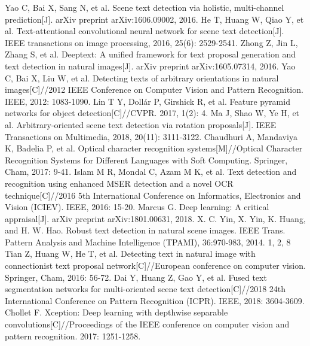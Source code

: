 \documentclass[22pt, UTF8]{article}
\numberwithin{figure}{section}
\numberwithin{table}{section}
\numberwithin{equation}{section} %
\begin{document}
\newpage
\begin{thebibliography}{42} %
\addtolength{\itemsep}{-0.5 em} %

Yao C, Bai X, Sang N, et al. Scene text detection via holistic, multi-channel prediction[J]. arXiv preprint arXiv:1606.09002, 2016.
\bibitem{}
He T, Huang W, Qiao Y, et al. Text-attentional convolutional neural network for scene text detection[J]. IEEE transactions on image processing, 2016, 25(6): 2529-2541.
\bibitem{}
Zhong Z, Jin L, Zhang S, et al. Deeptext: A unified framework for text proposal generation and text detection in natural images[J]. arXiv preprint arXiv:1605.07314, 2016.
\bibitem{}
Yao C, Bai X, Liu W, et al. Detecting texts of arbitrary orientations in natural images[C]//2012 IEEE Conference on Computer Vision and Pattern Recognition. IEEE, 2012: 1083-1090.
\bibitem{}
Lin T Y, Dollár P, Girshick R, et al. Feature pyramid networks for object detection[C]//CVPR. 2017, 1(2): 4.
\bibitem{}
Ma J, Shao W, Ye H, et al. Arbitrary-oriented scene text detection via rotation proposals[J]. IEEE Transactions on Multimedia, 2018, 20(11): 3111-3122.
\bibitem{}
Chaudhuri A, Mandaviya K, Badelia P, et al. Optical character recognition systems[M]//Optical Character Recognition Systems for Different Languages with Soft Computing. Springer, Cham, 2017: 9-41.
\bibitem{}
Islam M R, Mondal C, Azam M K, et al. Text detection and recognition using enhanced MSER detection and a novel OCR technique[C]//2016 5th International Conference on Informatics, Electronics and Vision (ICIEV). IEEE, 2016: 15-20.
\bibitem{}
Marcus G. Deep learning: A critical appraisal[J]. arXiv preprint arXiv:1801.00631, 2018.
\bibitem{}
X. C. Yin, X. Yin, K. Huang, and H. W. Hao. Robust text detection in natural scene images. IEEE Trans. Pattern Analysis and Machine Intelligence (TPAMI), 36:970-983, 2014. 1, 2, 8
\bibitem{}
Tian Z, Huang W, He T, et al. Detecting text in natural image with connectionist text proposal network[C]//European conference on computer vision. Springer, Cham, 2016: 56-72.
\bibitem{}
Dai Y, Huang Z, Gao Y, et al. Fused text segmentation networks for multi-oriented scene text detection[C]//2018 24th International Conference on Pattern Recognition (ICPR). IEEE, 2018: 3604-3609.
\bibitem{}
Chollet F. Xception: Deep learning with depthwise separable convolutions[C]//Proceedings of the IEEE conference on computer vision and pattern recognition. 2017: 1251-1258.

\end{thebibliography}
\end{document}
